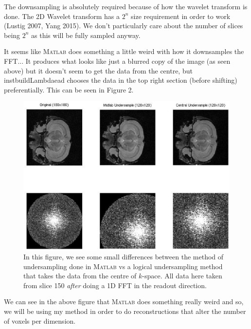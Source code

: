 \documentclass[11 pt]{article}
\newcommand{\matlab}{\textsc{Matlab }}
\begin{document}
    The downsampling is absolutely required because of how the wavelet transform is done. The 2D Wavelet transform has a $2^n$ size requirement in order to work (Lustig 2007, Yang 2015). We don't particularly care about the number of slices being $2^n$ as this will be fully sampled anyway. 

    It seems like \matlab does something a little weird with how it downsamples the FFT... It produces what looks like just a blurred copy of the image (as seen above) but it doesn't seem to get the data from the centre, but instbuildLambdaead chooses the data in the top right section (before shifting) preferentially. This can be seen in Figure 2.

    \newpage
    \begin{figure}[h] 

      \centering
      \vspace{0pt}
      \setlength\fboxsep{0pt}
      \setlength\fboxrule{0.5pt}
      \includegraphics[trim = {36mm 20mm 20mm 8mm},clip,scale = 0.6] {Figs/CS_DTI_Sims/FullvsMatvsCent.eps}
      \caption{In this figure, we see some small differences between the method of undersampling done in \matlab vs a logical undersampling method that takes the data from the centre of $k$-space. All data here taken from slice 150 \emph{after} doing a 1D FFT in the readout direction.}
      \label{fig:matvscent}

      \end{figure}

    We can see in the above figure that \matlab does something really weird and so, we will be using my method in order to do reconstructions that alter the number of voxels per dimension.
\end{document}
